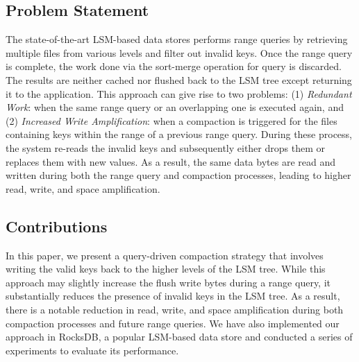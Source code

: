 \subsection{Problem Statement}
The state-of-the-art LSM-based data stores performs range queries by retrieving multiple files from various levels and 
filter out invalid keys. Once the range query is complete, the work done via the sort-merge operation for query is 
discarded. The results are neither cached nor flushed back to the LSM tree except returning it to the application. This 
approach can give rise to two problems: (1) \textit{Redundant Work}: when the same range query or 
an overlapping one is executed again, and (2) \textit{Increased Write Amplification}: when a compaction is triggered 
for the files containing keys within the range of a previous range query. During these process, the system re-reads the 
invalid keys and subsequently either drops them or replaces them with new values. As a result, the same data bytes are 
read and written during both the range query and compaction processes, leading to higher read, write, and space 
amplification.


\subsection{Contributions}
In this paper, we present a query-driven compaction strategy that involves writing the valid keys back to the higher 
levels of the LSM tree. While this approach may slightly increase the flush write bytes during a range query, it 
substantially reduces the presence of invalid keys in the LSM tree. As a result, there is a notable reduction in read, 
write, and space amplification during both compaction processes and future range queries. We have also implemented our
approach in RocksDB, a popular LSM-based data store and conducted a series of experiments to evaluate its performance.